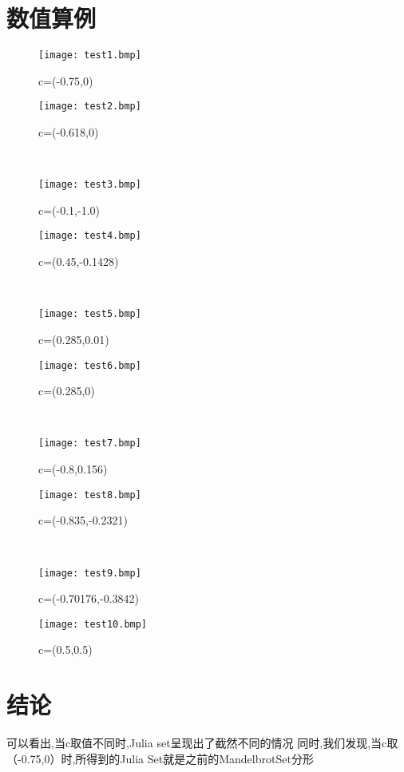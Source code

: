 \documentclass[a4paper]{ctexart}
\begin{document}
\section{数值算例}
\begin{figure}[H]
\centering
\begin{minipage}{0.45\textwidth}
\centerline{\texttt{[image: test1.bmp]}}
\centerline{c=(-0.75,0)}
\end{minipage}
\begin{minipage}{0.45\textwidth}
\centerline{\texttt{[image: test2.bmp]}}
\centerline{c=(-0.618,0)}
\end{minipage}
\\
\begin{minipage}{0.45\textwidth}
\centerline{\texttt{[image: test3.bmp]}}
\centerline{c=(-0.1,-1.0)}
\end{minipage}
\begin{minipage}{0.45\textwidth}
\centerline{\texttt{[image: test4.bmp]}}
\centerline{c=(0.45,-0.1428)}
\end{minipage}
\\
\begin{minipage}{0.45\textwidth}
\centerline{\texttt{[image: test5.bmp]}}
\centerline{c=(0.285,0.01)}
\end{minipage}
\begin{minipage}{0.45\textwidth}
\centerline{\texttt{[image: test6.bmp]}}
\centerline{c=(0.285,0)}
\end{minipage}
\\
\begin{minipage}{0.45\textwidth}
\centerline{\texttt{[image: test7.bmp]}}
\centerline{c=(-0.8,0.156)}
\end{minipage}
\begin{minipage}{0.45\textwidth}
\centerline{\texttt{[image: test8.bmp]}}
\centerline{c=(-0.835,-0.2321)}
\end{minipage}
\\
\begin{minipage}{0.45\textwidth}
\centerline{\texttt{[image: test9.bmp]}}
\centerline{c=(-0.70176,-0.3842)}
\end{minipage}
\begin{minipage}{0.45\textwidth}
\centerline{\texttt{[image: test10.bmp]}}
\centerline{c=(0.5,0.5)}
\end{minipage}
\end{figure}

\section{结论}
可以看出,当c取值不同时,Julia set呈现出了截然不同的情况
同时,我们发现,当c取（-0.75,0）时,所得到的Julia Set就是之前的MandelbrotSet分形



\end{document}
